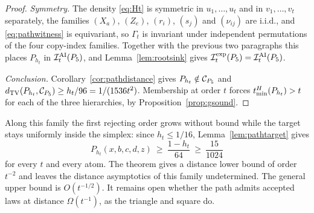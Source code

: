\begin{proof}
\emph{Symmetry.} The density \eqref{eq:Ht} is symmetric in $u_1,\dots,u_t$ and in $v_1,\dots,v_t$ separately, the families $(X_a)$, $(Z_e)$, $(r_i)$, $(s_j)$ and $(\nu_{ij})$ are i.i.d., and \eqref{eq:pathwitness} is equivariant, so $\Gamma_t$ is invariant under independent permutations of the four copy-index families. Together with the previous two paragraphs this places $P_{h_t}$ in $\mathcal I^{\mathrm{AI}}_t(P_5)$, and Lemma~\ref{lem:rootsink} gives $\mathcal I^{\mathrm{exp}}_t(P_5)=\mathcal I^{\mathrm{AI}}_t(P_5)$.

\emph{Conclusion.} Corollary~\ref{cor:pathdistance} gives $P_{h_t}\notin\mathcal C_{P_5}$ and
$d_{\operatorname{TV}}(P_{h_t},\mathcal C_{P_5})\ge h_t/96=1/(1536t^2)$. Membership at order $t$ forces $t_{\min}^H(P_{h_t})>t$ for each of the three hierarchies, by Proposition~\ref{prop:gsound}.
\end{proof}

Along this family the first rejecting order grows without bound while the target stays uniformly inside the simplex: since $h_t\le1/16$, Lemma~\ref{lem:pathtarget} gives
\[
P_{h_t}(x,b,c,d,z)\ \ge\ \frac{1-h_t}{64}\ \ge\ \frac{15}{1024}
\]
for every $t$ and every atom. The theorem gives a distance lower bound of order $t^{-2}$ and leaves the distance asymptotics of this family undetermined. The general upper bound is $O(t^{-1/2})$. It remains open whether the path admits accepted laws at distance $\Omega(t^{-1})$, as the triangle and square do.
